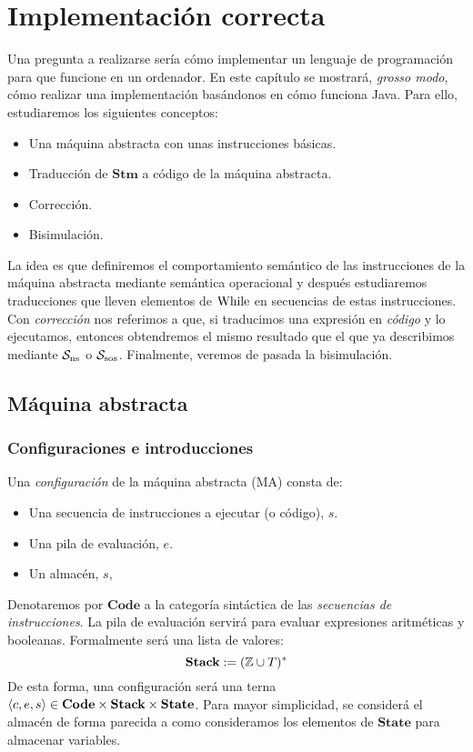 \cleardoublepage
\chapter{Implementación correcta}
Una pregunta a realizarse sería cómo implementar un lenguaje de programación para que funcione en un ordenador. En este capítulo se mostrará, \textit{grosso modo}, cómo realizar una implementación basándonos en cómo funciona Java. Para ello, estudiaremos los siguientes conceptos:
\begin{itemize}
    \item Una máquina abstracta con unas instrucciones básicas.
    \item Traducción de $\mathbf{Stm}$ a código de la máquina abstracta.
    \item Corrección.
    \item Bisimulación.
\end{itemize}

La idea es que definiremos el comportamiento semántico de las instrucciones de la máquina abstracta mediante semántica operacional y después estudiaremos traducciones que lleven elementos de $\mathrm{While}$ en secuencias de estas instrucciones. Con \textit{corrección} nos referimos a que, si traducimos una expresión en \textit{código} y lo ejecutamos, entonces obtendremos el mismo resultado que el que ya describimos mediante $\mathcal{S}_{\mathrm{ns}}$ o $\mathcal{S}_{\mathrm{sos}}$. Finalmente, veremos de pasada la bisimulación.

\section{Máquina abstracta}


\subsection{Configuraciones e introducciones}

Una \textit{configuración} de la máquina abstracta (MA) consta de:
\begin{itemize}
    \item Una secuencia de instrucciones a ejecutar (o código), $s$.
    \item Una pila de evaluación, $e$.
    \item Un almacén, $s$,
\end{itemize}
Denotaremos por $\mathbf{Code}$ a la categoría sintáctica de las \textit{secuencias de instrucciones}. La pila de evaluación servirá para evaluar expresiones aritméticas y booleanas. Formalmente será una lista de valores:
\[
    \textbf{Stack} := (\mathbb{Z}\cup T)^*
\]
De esta forma, una configuración será una terna $\langle c, e, s \rangle \in \textbf{Code}\times\textbf{Stack} \times \textbf{State}$. Para mayor simplicidad, se considerá el almacén de forma parecida a como consideramos los elementos de $\textbf{State}$ para almacenar variables.
\\

